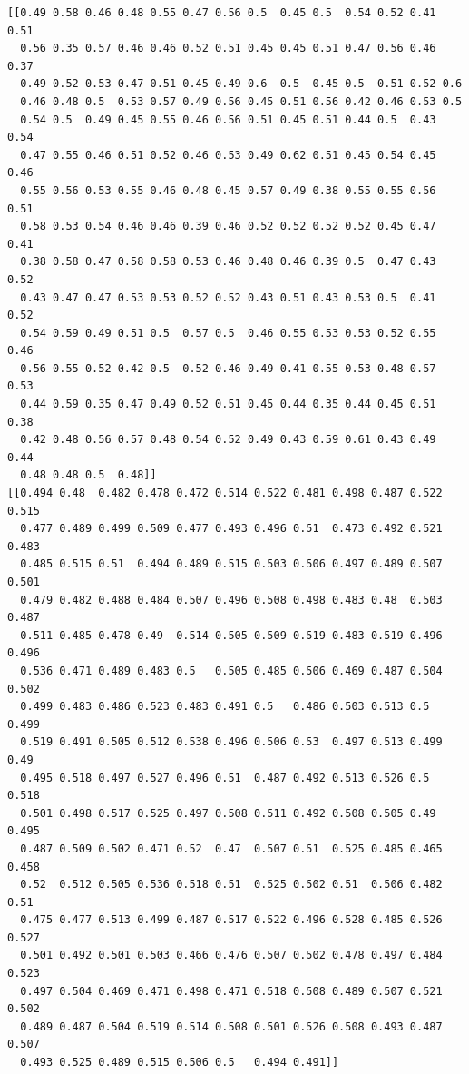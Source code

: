 \documentclass[11pt]{article}
\begin{document}
    \begin{Verbatim}[commandchars=\\\{\}]
[[0.49 0.58 0.46 0.48 0.55 0.47 0.56 0.5  0.45 0.5  0.54 0.52 0.41 0.51
  0.56 0.35 0.57 0.46 0.46 0.52 0.51 0.45 0.45 0.51 0.47 0.56 0.46 0.37
  0.49 0.52 0.53 0.47 0.51 0.45 0.49 0.6  0.5  0.45 0.5  0.51 0.52 0.6
  0.46 0.48 0.5  0.53 0.57 0.49 0.56 0.45 0.51 0.56 0.42 0.46 0.53 0.5
  0.54 0.5  0.49 0.45 0.55 0.46 0.56 0.51 0.45 0.51 0.44 0.5  0.43 0.54
  0.47 0.55 0.46 0.51 0.52 0.46 0.53 0.49 0.62 0.51 0.45 0.54 0.45 0.46
  0.55 0.56 0.53 0.55 0.46 0.48 0.45 0.57 0.49 0.38 0.55 0.55 0.56 0.51
  0.58 0.53 0.54 0.46 0.46 0.39 0.46 0.52 0.52 0.52 0.52 0.45 0.47 0.41
  0.38 0.58 0.47 0.58 0.58 0.53 0.46 0.48 0.46 0.39 0.5  0.47 0.43 0.52
  0.43 0.47 0.47 0.53 0.53 0.52 0.52 0.43 0.51 0.43 0.53 0.5  0.41 0.52
  0.54 0.59 0.49 0.51 0.5  0.57 0.5  0.46 0.55 0.53 0.53 0.52 0.55 0.46
  0.56 0.55 0.52 0.42 0.5  0.52 0.46 0.49 0.41 0.55 0.53 0.48 0.57 0.53
  0.44 0.59 0.35 0.47 0.49 0.52 0.51 0.45 0.44 0.35 0.44 0.45 0.51 0.38
  0.42 0.48 0.56 0.57 0.48 0.54 0.52 0.49 0.43 0.59 0.61 0.43 0.49 0.44
  0.48 0.48 0.5  0.48]]
[[0.494 0.48  0.482 0.478 0.472 0.514 0.522 0.481 0.498 0.487 0.522 0.515
  0.477 0.489 0.499 0.509 0.477 0.493 0.496 0.51  0.473 0.492 0.521 0.483
  0.485 0.515 0.51  0.494 0.489 0.515 0.503 0.506 0.497 0.489 0.507 0.501
  0.479 0.482 0.488 0.484 0.507 0.496 0.508 0.498 0.483 0.48  0.503 0.487
  0.511 0.485 0.478 0.49  0.514 0.505 0.509 0.519 0.483 0.519 0.496 0.496
  0.536 0.471 0.489 0.483 0.5   0.505 0.485 0.506 0.469 0.487 0.504 0.502
  0.499 0.483 0.486 0.523 0.483 0.491 0.5   0.486 0.503 0.513 0.5   0.499
  0.519 0.491 0.505 0.512 0.538 0.496 0.506 0.53  0.497 0.513 0.499 0.49
  0.495 0.518 0.497 0.527 0.496 0.51  0.487 0.492 0.513 0.526 0.5   0.518
  0.501 0.498 0.517 0.525 0.497 0.508 0.511 0.492 0.508 0.505 0.49  0.495
  0.487 0.509 0.502 0.471 0.52  0.47  0.507 0.51  0.525 0.485 0.465 0.458
  0.52  0.512 0.505 0.536 0.518 0.51  0.525 0.502 0.51  0.506 0.482 0.51
  0.475 0.477 0.513 0.499 0.487 0.517 0.522 0.496 0.528 0.485 0.526 0.527
  0.501 0.492 0.501 0.503 0.466 0.476 0.507 0.502 0.478 0.497 0.484 0.523
  0.497 0.504 0.469 0.471 0.498 0.471 0.518 0.508 0.489 0.507 0.521 0.502
  0.489 0.487 0.504 0.519 0.514 0.508 0.501 0.526 0.508 0.493 0.487 0.507
  0.493 0.525 0.489 0.515 0.506 0.5   0.494 0.491]]

    \end{Verbatim}
\end{document}
